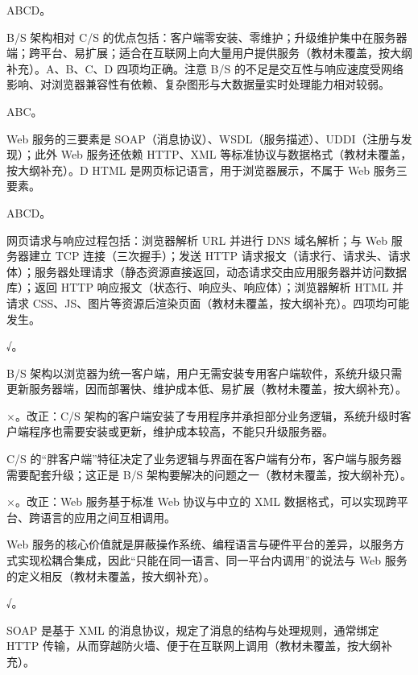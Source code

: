 \documentclass[a4paper,11pt]{article}
\begin{document}
\q ABCD。\begin{analysis}B/S 架构相对 C/S 的优点包括：客户端零安装、零维护；升级维护集中在服务器端；跨平台、易扩展；适合在互联网上向大量用户提供服务（教材未覆盖，按大纲补充）。A、B、C、D 四项均正确。注意 B/S 的不足是交互性与响应速度受网络影响、对浏览器兼容性有依赖、复杂图形与大数据量实时处理能力相对较弱。\end{analysis}

\q ABC。\begin{analysis}Web 服务的三要素是 SOAP（消息协议）、WSDL（服务描述）、UDDI（注册与发现）；此外 Web 服务还依赖 HTTP、XML 等标准协议与数据格式（教材未覆盖，按大纲补充）。D HTML 是网页标记语言，用于浏览器展示，不属于 Web 服务三要素。\end{analysis}

\q ABCD。\begin{analysis}网页请求与响应过程包括：浏览器解析 URL 并进行 DNS 域名解析；与 Web 服务器建立 TCP 连接（三次握手）；发送 HTTP 请求报文（请求行、请求头、请求体）；服务器处理请求（静态资源直接返回，动态请求交由应用服务器并访问数据库）；返回 HTTP 响应报文（状态行、响应头、响应体）；浏览器解析 HTML 并请求 CSS、JS、图片等资源后渲染页面（教材未覆盖，按大纲补充）。四项均可能发生。\end{analysis}


\q √。\begin{analysis}B/S 架构以浏览器为统一客户端，用户无需安装专用客户端软件，系统升级只需更新服务器端，因而部署快、维护成本低、易扩展（教材未覆盖，按大纲补充）。\end{analysis}

\q ×。改正：C/S 架构的客户端安装了专用程序并承担部分业务逻辑，系统升级时客户端程序也需要安装或更新，维护成本较高，不能只升级服务器。\begin{analysis}C/S 的“胖客户端”特征决定了业务逻辑与界面在客户端有分布，客户端与服务器需要配套升级；这正是 B/S 架构要解决的问题之一（教材未覆盖，按大纲补充）。\end{analysis}

\q ×。改正：Web 服务基于标准 Web 协议与中立的 XML 数据格式，可以实现跨平台、跨语言的应用之间互相调用。\begin{analysis}Web 服务的核心价值就是屏蔽操作系统、编程语言与硬件平台的差异，以服务方式实现松耦合集成，因此“只能在同一语言、同一平台内调用”的说法与 Web 服务的定义相反（教材未覆盖，按大纲补充）。\end{analysis}

\q √。\begin{analysis}SOAP 是基于 XML 的消息协议，规定了消息的结构与处理规则，通常绑定 HTTP 传输，从而穿越防火墙、便于在互联网上调用（教材未覆盖，按大纲补充）。\end{analysis}
\end{document}
